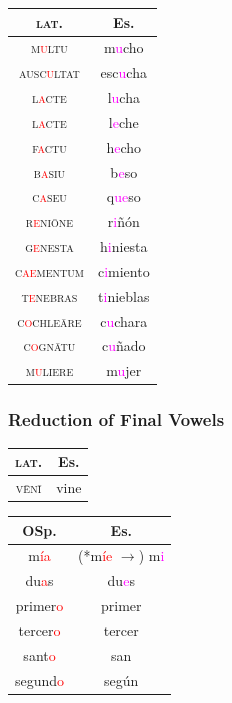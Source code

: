 \documentclass{report}[12pt]
\begin{document}
\begin{tabular}{c c}
  \textsc{lat.} & Es. \\
  \hline
  \textsc{m\textcolor{red}{u}ltu} & m\textcolor{magenta}{u}cho \\
  \textsc{ausc\textcolor{red}{u}ltat} & esc\textcolor{magenta}{u}cha \\
  \textsc{l\textcolor{red}{a}cte} & l\textcolor{magenta}{u}cha \\
  \textsc{l\textcolor{red}{a}cte} & l\textcolor{magenta}{e}che \\
  \textsc{f\textcolor{red}{a}ctu} & h\textcolor{magenta}{e}cho \\
  \textsc{b\textcolor{red}{a}siu} & b\textcolor{magenta}{e}so \\
  \textsc{c\textcolor{red}{a}seu} & q\textcolor{magenta}{ue}so \\
  \textsc{r\textcolor{red}{e}ni\={o}ne} & r\textcolor{magenta}{i}ñón \\
  \textsc{g\textcolor{red}{e}nesta} & h\textcolor{magenta}{i}niesta \\
  \textsc{c\textcolor{red}{ae}mentum} & c\textcolor{magenta}{i}miento \\
  \textsc{t\textcolor{red}{e}nebras} & t\textcolor{magenta}{i}nieblas \\
  \textsc{c\textcolor{red}{o}chle\={a}re} & c\textcolor{magenta}{u}chara \\
  \textsc{c\textcolor{red}{o}gn\={a}tu} & c\textcolor{magenta}{u}ñado \\
  \textsc{m\textcolor{red}{u}liere} & m\textcolor{magenta}ujer \\
\end{tabular}

\subsubsection*{Reduction of Final Vowels}

\begin{tcolorbox}

\end{tcolorbox}

\begin{tabular}{c c}
  \textsc{lat.} & Es. \\
  \hline
  \textsc{v\={e}n\={i}} & vine \\  
\end{tabular}

\begin{tabular}{c c}
  OSp. & Es. \\
  \hline
  m\textcolor{red}{ía} & (*m\textcolor{red}{íe} $\rightarrow$) m\textcolor{magenta}{i} \\
  du\textcolor{red}{a}s & du\textcolor{magenta}{e}s \\
  primer\textcolor{red}{o} & primer \\
  tercer\textcolor{red}{o} & tercer \\
  sant\textcolor{red}{o} & san \\
  segund\textcolor{red}{o} & según \\
\end{tabular}
\end{document}
